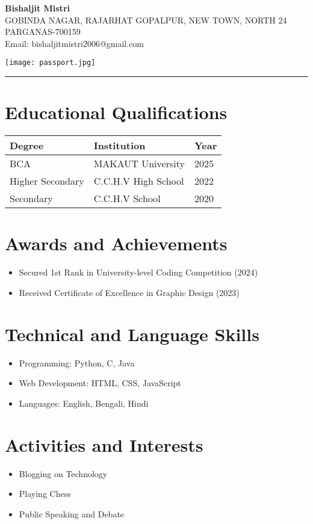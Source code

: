 \documentclass[a4paper,12pt]{article}
\begin{document}
\begin{minipage}{0.7\textwidth}
    \LARGE{\textbf{Bishaljit Mistri}} \\
    \normalsize
    GOBINDA NAGAR, RAJARHAT GOPALPUR, NEW TOWN,
    NORTH 24 PARGANAS-700159\\
    Email: bishaljitmistri2006@gmail.com
\end{minipage}
\hfill
\begin{minipage}{0.25\textwidth}
    \texttt{[image: passport.jpg]} %
\end{minipage}

\vspace{0.5cm}
\hrule
\vspace{0.5cm}

\section*{Educational Qualifications}
\begin{tabular}{|m{4cm}|m{5cm}|m{3cm}|}
\hline
\textbf{Degree} & \textbf{Institution} & \textbf{Year} \\
\hline
BCA & MAKAUT University & 2025 \\
\hline
Higher Secondary & C.C.H.V High School & 2022 \\
\hline
Secondary & C.C.H.V School & 2020 \\
\hline
\end{tabular}

\vspace{0.5cm}

\section*{Awards and Achievements}
\begin{itemize}
    \item Secured 1st Rank in University-level Coding Competition (2024)
    \item Received Certificate of Excellence in Graphic Design (2023)
\end{itemize}

\section*{Technical and Language Skills}
\begin{itemize}
    \item Programming: Python, C, Java
    \item Web Development: HTML, CSS, JavaScript
    \item Languages: English, Bengali, Hindi
\end{itemize}

\section*{Activities and Interests}
\begin{itemize}
    \item Blogging on Technology
    \item Playing Chess
    \item Public Speaking and Debate
\end{itemize}
\end{document}
